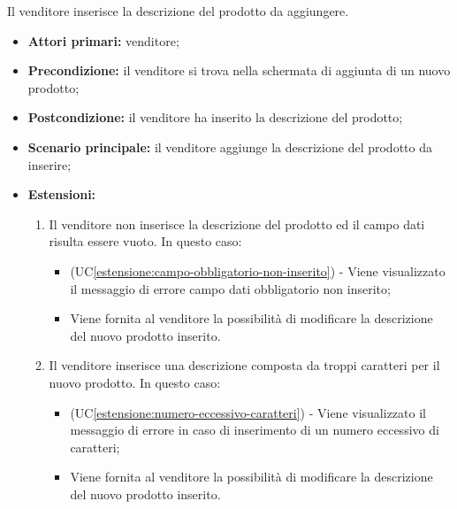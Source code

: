 Il venditore inserisce la descrizione del prodotto da aggiungere.
\begin{itemize}
    \item \textbf{Attori primari:} venditore;
    \item \textbf{Precondizione:} il venditore si trova nella schermata di aggiunta di un nuovo prodotto;
    \item \textbf{Postcondizione:} il venditore ha inserito la descrizione del prodotto;
    \item \textbf{Scenario principale:} il venditore aggiunge la descrizione del prodotto da inserire;
    \item \textbf{Estensioni:}
    \begin{enumerate}[label=\lett]
    	\item Il venditore non inserisce la descrizione del prodotto ed il campo dati risulta essere vuoto. In questo caso:
    	\begin{itemize}
    		\item (UC\ref{estensione:campo-obbligatorio-non-inserito}) - Viene visualizzato il messaggio di errore campo dati obbligatorio non inserito;
    		\item Viene fornita al venditore la possibilità di modificare la descrizione del nuovo prodotto inserito.
    	\end{itemize}
        \item Il venditore inserisce una descrizione composta da troppi caratteri per il nuovo prodotto. In questo caso:
	    \begin{itemize}
    		\item (UC\ref{estensione:numero-eccessivo-caratteri}) - Viene visualizzato il messaggio di errore in caso di inserimento di un numero eccessivo di caratteri;
	    	\item Viene fornita al venditore la possibilità di modificare la descrizione del nuovo prodotto inserito.
	    \end{itemize}
    \end{enumerate}
\end{itemize}

\label{aggiunta-prodotto.categorie}

